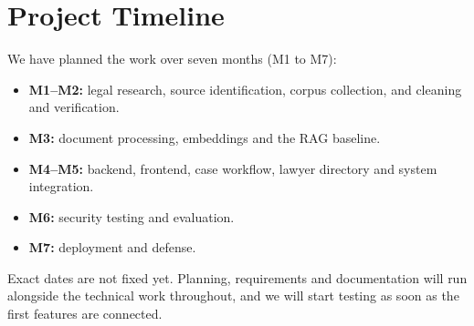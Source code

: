 \documentclass[12pt,a4paper]{report}
\begin{document}
\section{Project Timeline}
We have planned the work over seven months (M1 to M7):
\begin{itemize}
  \item \textbf{M1--M2:} legal research, source identification, corpus collection, and cleaning and verification.
  \item \textbf{M3:} document processing, embeddings and the RAG baseline.
  \item \textbf{M4--M5:} backend, frontend, case workflow, lawyer directory and system integration.
  \item \textbf{M6:} security testing and evaluation.
  \item \textbf{M7:} deployment and defense.
\end{itemize}
Exact dates are not fixed yet. Planning, requirements and documentation will run alongside the technical work throughout, and we will start testing as soon as the first features are connected.
\end{document}
